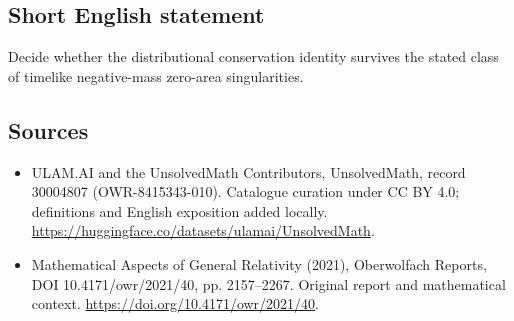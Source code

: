 \documentclass[11pt]{article}
\begin{document}
\subsection{Short English statement}
Decide whether the distributional conservation identity survives the stated class of timelike negative-mass zero-area singularities.
\subsection{Sources}
\begin{itemize}
\item[\hypertarget{source:30004807:1}{S1}] ULAM.AI and the UnsolvedMath Contributors, UnsolvedMath, record 30004807 (OWR-8415343-010). Catalogue curation under CC BY 4.0; definitions and English exposition added locally.
\url{https://huggingface.co/datasets/ulamai/UnsolvedMath}.
\item[\hypertarget{source:30004807:2}{S2}] Mathematical Aspects of General Relativity (2021), Oberwolfach Reports, DOI 10.4171/owr/2021/40, pp. 2157--2267. Original report and mathematical context.
\url{https://doi.org/10.4171/owr/2021/40}.
\end{itemize}
\label{end:30004807}
\end{document}
